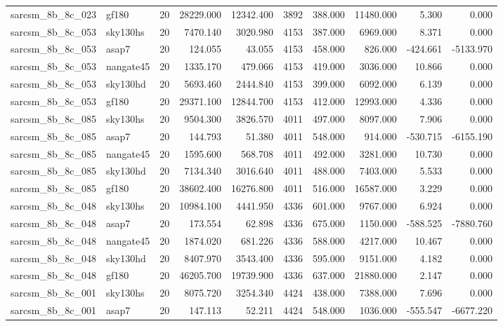 \begin{longtable}{llrrrrrrrr}
sarcsm\_8b\_8c\_023 & gf180 & 20 & 28229.000 & 12342.400 & 3892 & 388.000 & 11480.000 & 5.300 & 0.000 \\
sarcsm\_8b\_8c\_053 & sky130hs & 20 & 7470.140 & 3020.980 & 4153 & 387.000 & 6969.000 & 8.371 & 0.000 \\
sarcsm\_8b\_8c\_053 & asap7 & 20 & 124.055 & 43.055 & 4153 & 458.000 & 826.000 & -424.661 & -5133.970 \\
sarcsm\_8b\_8c\_053 & nangate45 & 20 & 1335.170 & 479.066 & 4153 & 419.000 & 3036.000 & 10.866 & 0.000 \\
sarcsm\_8b\_8c\_053 & sky130hd & 20 & 5693.460 & 2444.840 & 4153 & 399.000 & 6092.000 & 6.139 & 0.000 \\
sarcsm\_8b\_8c\_053 & gf180 & 20 & 29371.100 & 12844.700 & 4153 & 412.000 & 12993.000 & 4.336 & 0.000 \\
sarcsm\_8b\_8c\_085 & sky130hs & 20 & 9504.300 & 3826.570 & 4011 & 497.000 & 8097.000 & 7.906 & 0.000 \\
sarcsm\_8b\_8c\_085 & asap7 & 20 & 144.793 & 51.380 & 4011 & 548.000 & 914.000 & -530.715 & -6155.190 \\
sarcsm\_8b\_8c\_085 & nangate45 & 20 & 1595.600 & 568.708 & 4011 & 492.000 & 3281.000 & 10.730 & 0.000 \\
sarcsm\_8b\_8c\_085 & sky130hd & 20 & 7134.340 & 3016.640 & 4011 & 488.000 & 7403.000 & 5.533 & 0.000 \\
sarcsm\_8b\_8c\_085 & gf180 & 20 & 38602.400 & 16276.800 & 4011 & 516.000 & 16587.000 & 3.229 & 0.000 \\
sarcsm\_8b\_8c\_048 & sky130hs & 20 & 10984.100 & 4441.950 & 4336 & 601.000 & 9767.000 & 6.924 & 0.000 \\
sarcsm\_8b\_8c\_048 & asap7 & 20 & 173.554 & 62.898 & 4336 & 675.000 & 1150.000 & -588.525 & -7880.760 \\
sarcsm\_8b\_8c\_048 & nangate45 & 20 & 1874.020 & 681.226 & 4336 & 588.000 & 4217.000 & 10.467 & 0.000 \\
sarcsm\_8b\_8c\_048 & sky130hd & 20 & 8407.970 & 3543.400 & 4336 & 595.000 & 9151.000 & 4.182 & 0.000 \\
sarcsm\_8b\_8c\_048 & gf180 & 20 & 46205.700 & 19739.900 & 4336 & 637.000 & 21880.000 & 2.147 & 0.000 \\
sarcsm\_8b\_8c\_001 & sky130hs & 20 & 8075.720 & 3254.340 & 4424 & 438.000 & 7388.000 & 7.696 & 0.000 \\
sarcsm\_8b\_8c\_001 & asap7 & 20 & 147.113 & 52.211 & 4424 & 548.000 & 1036.000 & -555.547 & -6677.220 \\

\end{longtable}
